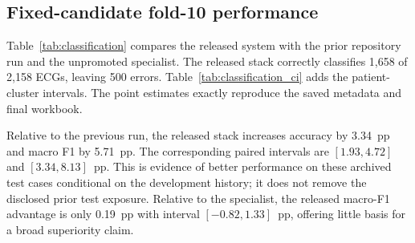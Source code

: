 \subsection{Fixed-candidate fold-10 performance}
Table~\ref{tab:classification} compares the released system with the prior repository run and the unpromoted specialist. The released stack correctly classifies 1,658 of 2,158 ECGs, leaving 500 errors. Table~\ref{tab:classification_ci} adds the patient-cluster intervals. The point estimates exactly reproduce the saved metadata and final workbook.

\begin{table}[htbp]\centering\small

\caption{Completed fixed-candidate results on the same eligible fold-10 cohort. Values are percentages. The specialist was evaluated once after its own lock and was not promoted.}\label{tab:classification}\end{table}

\begin{table}[htbp]\centering\small

\caption{Retrospective 10,000-resample patient-cluster percentile intervals for the released stack. They account for repeated ECGs within patients, conditional on fixed predictions.}\label{tab:classification_ci}\end{table}


\begin{table}[htbp]\centering\small
\resizebox{\linewidth}{!}{}
\caption{Retrospective paired differences of the released stack against each comparator, with patient-cluster 95\% intervals. Units are percentage points (pp), not relative percent improvement.}\label{tab:paired}\end{table}

Relative to the previous run, the released stack increases accuracy by 3.34~pp and macro F1 by 5.71~pp. The corresponding paired intervals are $[1.93,4.72]$ and $[3.34,8.13]$~pp. This is evidence of better performance on these archived test cases conditional on the development history; it does not remove the disclosed prior test exposure. Relative to the specialist, the released macro-F1 advantage is only 0.19~pp with interval $[-0.82,1.33]$~pp, offering little basis for a broad superiority claim.


